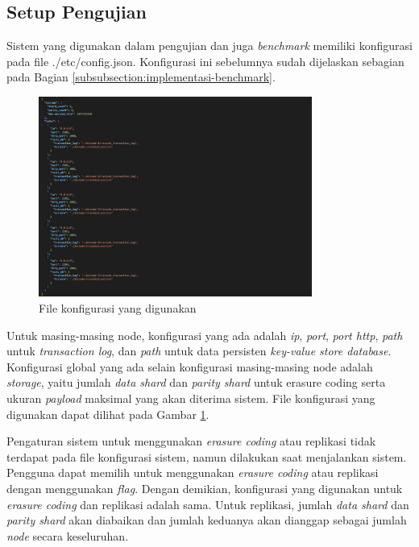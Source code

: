\subsection{Setup Pengujian}
\label{subsection:setup-pengujian}

Sistem yang digunakan dalam pengujian dan juga \textit{benchmark} memiliki konfigurasi pada file ./etc/config.json. Konfigurasi ini sebelumnya sudah dijelaskan sebagian pada Bagian \ref{subsubsection:implementasi-benchmark}.

\begin{figure}[ht]
    \centering
    \includegraphics[width=0.80\textwidth]{resources/chapter-4/konfigurasi.png}
    \caption{File konfigurasi yang digunakan}
    \label{fig:config-json}
\end{figure}


Untuk masing-masing node, konfigurasi yang ada adalah \textit{ip}, \textit{port}, \textit{port http}, \textit{path} untuk \textit{transaction log}, dan \textit{path} untuk data persisten \textit{key-value store database}. Konfigurasi global yang ada selain konfigurasi masing-masing node adalah \textit{storage}, yaitu jumlah \textit{data shard} dan \textit{parity shard} untuk erasure coding serta ukuran \textit{payload} maksimal yang akan diterima sistem. File konfigurasi yang digunakan dapat dilihat pada Gambar \ref{fig:config-json}.

Pengaturan sistem untuk menggunakan \textit{erasure coding} atau replikasi tidak terdapat pada file konfigurasi sistem, namun dilakukan saat menjalankan sistem. Pengguna dapat memilih untuk menggunakan \textit{erasure coding} atau
replikasi dengan menggunakan \textit{flag}. Dengan demikian, konfigurasi yang digunakan untuk \textit{erasure coding} dan replikasi adalah sama. Untuk replikasi, jumlah \textit{data shard} dan \textit{parity shard} akan diabaikan dan jumlah keduanya akan dianggap sebagai jumlah \textit{node} secara keseluruhan.

